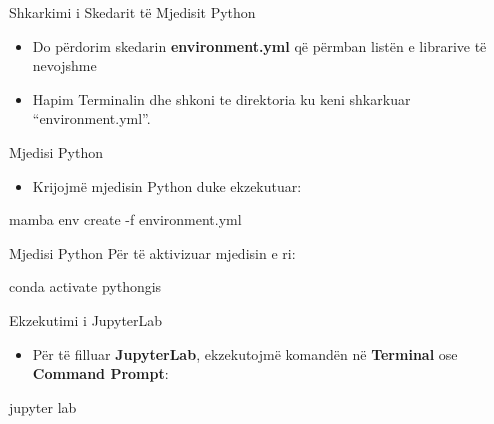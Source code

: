 \documentclass[
  ignorenonframetext,
]{beamer}
\newenvironment{Shaded}{\begin{snugshade}}{\end{snugshade}}
\newcommand{\NormalTok}[1]{#1}
\providecommand{\tightlist}{%
  \setlength{\itemsep}{0pt}\setlength{\parskip}{0pt}}
\begin{document}
\begin{frame}{Shkarkimi i Skedarit të Mjedisit Python}
\protect\hypertarget{shkarkimi-i-skedarit-tuxeb-mjedisit-python}{}
\begin{itemize}
\item
  Do përdorim skedarin \textbf{environment.yml} që përmban listën e
  librarive të nevojshme
\item
  Hapim Terminalin dhe shkoni te direktoria ku keni shkarkuar
  ``environment.yml''.
\end{itemize}
\end{frame}

\begin{frame}[fragile]{Mjedisi Python}
\protect\hypertarget{mjedisi-python}{}
\begin{itemize}
\tightlist
\item
  Krijojmë mjedisin Python duke ekzekutuar:
\end{itemize}

\begin{Shaded}
\begin{Highlighting}[]
\NormalTok{mamba env create {-}f environment.yml}
\end{Highlighting}
\end{Shaded}
\end{frame}

\begin{frame}[fragile]{Mjedisi Python}
\protect\hypertarget{mjedisi-python-1}{}
Për të aktivizuar mjedisin e ri:

\begin{Shaded}
\begin{Highlighting}[]
\NormalTok{conda activate pythongis}
\end{Highlighting}
\end{Shaded}
\end{frame}

\begin{frame}[fragile]{Ekzekutimi i JupyterLab}
\protect\hypertarget{ekzekutimi-i-jupyterlab}{}
\begin{itemize}
\tightlist
\item
  Për të filluar \textbf{JupyterLab}, ekzekutojmë komandën në
  \textbf{Terminal} ose \textbf{Command Prompt}:
\end{itemize}

\begin{Shaded}
\begin{Highlighting}[]
\NormalTok{jupyter lab}
\end{Highlighting}
\end{Shaded}
\end{frame}
\end{document}
